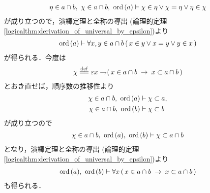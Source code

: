 \begin{sketch}
\begin{description}
\begin{align}
					\eta \in a \cap b,\ \chi \in a \cap b,\ \operatorname*{ord}\hspace{0.15em}(a) 
					\vdash \chi \in \eta \vee \chi = \eta \vee \eta \in \chi
				\end{align}
				が成り立つので，演繹定理と全称の導出
				(論理的定理\ref{logicalthm:derivation_of_universal_by_epsilon})より
				\begin{align}
					\operatorname*{ord}\hspace{0.15em}(a) \vdash \forall x,y \in a \cap b\, 
					(\, x \in y \vee x = y \vee y \in x\, )
				\end{align}
				が得られる．今度は
				\begin{align}
					\chi \defeq \varepsilon x \negation 
					(\, x \in a \cap b \rarrow x \subset a \cap b\, )
				\end{align}
				とおき直せば，順序数の推移性より
				\begin{align}
					\chi \in a \cap b,\ \operatorname*{ord}\hspace{0.15em}(a) &\vdash \chi \subset a, \\
					\chi \in a \cap b,\ \operatorname*{ord}\hspace{0.15em}(b) &\vdash \chi \subset b
				\end{align}
				が成り立つので
				\begin{align}
					\chi \in a \cap b,\ \operatorname*{ord}\hspace{0.15em}(a),\ \operatorname*{ord}\hspace{0.15em}(b) \vdash \chi \subset a \cap b
				\end{align}
				となり，演繹定理と全称の導出
				(論理的定理\ref{logicalthm:derivation_of_universal_by_epsilon})より
				\begin{align}
					\operatorname*{ord}\hspace{0.15em}(a),\ \operatorname*{ord}\hspace{0.15em}(b) \vdash 
					\forall x\, (\, x \in a \cap b \hspace{0.25em}\rightarrow\hspace{0.25em} x \subset a \cap b\, )
				\end{align}
				も得られる．
				

\end{description}
\end{sketch}
